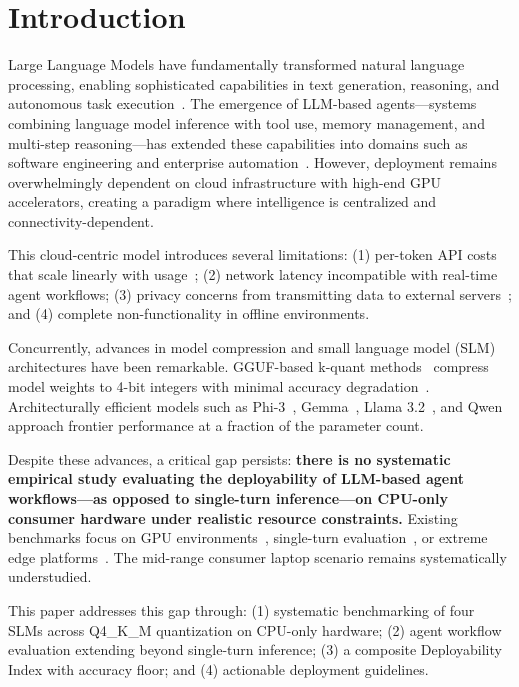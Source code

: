 \documentclass[conference]{IEEEtran}
\begin{document}
\section{Introduction}

Large Language Models have fundamentally transformed natural language processing, enabling sophisticated capabilities in text generation, reasoning, and autonomous task execution~\cite{vaswani2017attention, wei2022chain}. The emergence of LLM-based agents---systems combining language model inference with tool use, memory management, and multi-step reasoning---has extended these capabilities into domains such as software engineering and enterprise automation~\cite{yao2023react, schick2023toolformer}. However, deployment remains overwhelmingly dependent on cloud infrastructure with high-end GPU accelerators, creating a paradigm where intelligence is centralized and connectivity-dependent.

This cloud-centric model introduces several limitations: (1) per-token API costs that scale linearly with usage~\cite{huang2025edge}; (2) network latency incompatible with real-time agent workflows; (3) privacy concerns from transmitting data to external servers~\cite{li2026quantization}; and (4) complete non-functionality in offline environments.

Concurrently, advances in model compression and small language model (SLM) architectures have been remarkable. GGUF-based k-quant methods~\cite{gerganov2023llamacpp} compress model weights to 4-bit integers with minimal accuracy degradation~\cite{kurt2026quantization, palmbench2025}. Architecturally efficient models such as Phi-3~\cite{phi3}, Gemma~\cite{gemma3}, Llama 3.2~\cite{llama32}, and Qwen~\cite{qwen3coder} approach frontier performance at a fraction of the parameter count.

Despite these advances, a critical gap persists: \textbf{there is no systematic empirical study evaluating the deployability of LLM-based agent workflows---as opposed to single-turn inference---on CPU-only consumer hardware under realistic resource constraints.} Existing benchmarks focus on GPU environments~\cite{stuhlmann2025bench360}, single-turn evaluation~\cite{kurt2026quantization}, or extreme edge platforms~\cite{nguyen2025sbc, matsutani2026distributed}. The mid-range consumer laptop scenario remains systematically understudied.

This paper addresses this gap through: (1) systematic benchmarking of four SLMs across Q4\_K\_M quantization on CPU-only hardware; (2) agent workflow evaluation extending beyond single-turn inference; (3) a composite Deployability Index with accuracy floor; and (4) actionable deployment guidelines.
\end{document}
